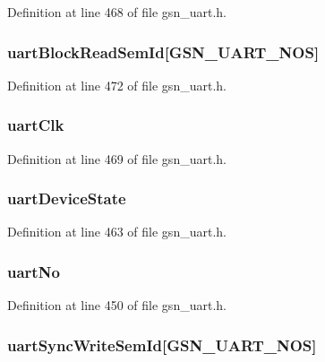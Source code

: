 Definition at line 468 of file gsn\_\-uart.h.

\hypertarget{a00263_a8b1b170dfa44896eb8c7f1eef0b8e9bd}{
\subsubsection[{uartBlockReadSemId}]{ {\bf uartBlockReadSemId}\mbox{[}GSN\_\-UART\_\-NOS\mbox{]}}}
\label{a00263_a8b1b170dfa44896eb8c7f1eef0b8e9bd}


Definition at line 472 of file gsn\_\-uart.h.

\hypertarget{a00263_a813915182cec971bec00857a79508bad}{
\subsubsection[{uartClk}]{ {\bf uartClk}}}
\label{a00263_a813915182cec971bec00857a79508bad}


Definition at line 469 of file gsn\_\-uart.h.

\hypertarget{a00263_ab86c2431a835b3c0682d5b34915f2914}{
\subsubsection[{uartDeviceState}]{ {\bf uartDeviceState}}}
\label{a00263_ab86c2431a835b3c0682d5b34915f2914}


Definition at line 463 of file gsn\_\-uart.h.

\hypertarget{a00263_a2595350cfd596e9acd266bb56bd4647a}{
\subsubsection[{uartNo}]{ {\bf uartNo}}}
\label{a00263_a2595350cfd596e9acd266bb56bd4647a}


Definition at line 450 of file gsn\_\-uart.h.

\hypertarget{a00263_afe5b5d88136be9f872a6a42123f04a98}{
\subsubsection[{uartSyncWriteSemId}]{ {\bf uartSyncWriteSemId}\mbox{[}GSN\_\-UART\_\-NOS\mbox{]}}}
\label{a00263_afe5b5d88136be9f872a6a42123f04a98}


